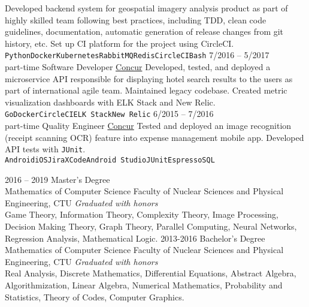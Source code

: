 \documentclass[9pt]{developercv} %
\begin{document}
\begin{entrylist}
        {Developed backend system for geospatial imagery analysis product as part of highly skilled team following best practices, including TDD, clean code guidelines, documentation, automatic generation of release changes from git history, etc. Set up CI platform for the project using CircleCI.\\
        \texttt{Python}\slashsep\texttt{Docker}\slashsep\texttt{Kubernetes}\slashsep\texttt{RabbitMQ}\slashsep\texttt{Redis}\slashsep\texttt{CircleCI}\slashsep\texttt{Bash}}
	\entry
		{7/2016 -- 5/2017\\\footnotesize{part-time}}
		{Software Developer}
        {\href{https://www.concur.com/}{Concur}}
        {
          Developed, tested, and deployed a microservice API responsible for displaying hotel search results to the users as part of international agile team. Maintained legacy codebase. Created metric visualization dashboards with ELK Stack and New Relic. \\ 
        \texttt{Go}\slashsep\texttt{Docker}\slashsep\texttt{CircleCI}\slashsep\texttt{ELK Stack}\slashsep\texttt{New Relic}
        }
	\entry
        {6/2015 -- 7/2016\\\footnotesize{part-time}}
		{Quality Engineer}
        {\href{https://www.concur.com/}{Concur}}
        {
          Tested and deployed an image recognition (receipt scanning OCR) feature into expense management mobile app. Developed API tests with \texttt{JUnit}.\\
          \texttt{Android}\slashsep\texttt{iOS}\slashsep\texttt{Jira}\slashsep\texttt{XCode}\slashsep\texttt{Android Studio}\slashsep\texttt{JUnit}\slashsep\texttt{Espresso}\slashsep\texttt{SQL}
        }
\end{entrylist}


\begin{entrylist}
	\entry
		{2016 -- 2019}
		{Master's Degree\\\footnotesize{Mathematics of Computer Science}}
		{Faculty of Nuclear Sciences and Physical Engineering, CTU}
        {\emph{Graduated with honors}\\Game Theory, Information Theory, Complexity Theory, Image Processing, Decision Making Theory, Graph Theory, Parallel Computing, Neural Networks, Regression Analysis, Mathematical Logic.}
	\entry
		{2013-2016}
		{Bachelor's Degree\\\footnotesize{Mathematics of Computer Science}}
		{Faculty of Nuclear Sciences and Physical Engineering, CTU}
		{\emph{Graduated with honors}\\Real Analysis, Discrete Mathematics, Differential Equations, Abstract Algebra, Algorithmization, Linear Algebra, Numerical Mathematics, Probability and Statistics, Theory of Codes, Computer Graphics.}
\end{entrylist}
\end{document}
